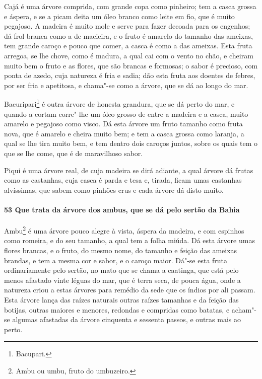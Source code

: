 \begin{linenumbers}
Cajá é uma árvore comprida, com grande copa como pinheiro; tem a casca grossa e áspera, e
se a picam deita um óleo branco como leite em fio, que é muito pegajoso. A madeira é muito
mole e serve para fazer decoada para os engenhos; dá frol branca como a de macieira, e o
fruto é amarelo do tamanho das ameixas, tem grande caroço e pouco que comer, a casca é
como a das ameixas. Esta fruta arregoa, se lhe chove, como é madura, a qual cai com o
vento no chão, e cheiram muito bem o fruto e as flores, que são brancas e formosas; o
sabor é precioso, com ponta de azedo, cuja natureza é fria e sadia; dão esta fruta aos
doentes de febres, por ser fria e apetitosa, e chama"-se como a árvore, que se dá ao longo
do mar.

Bacuripari\footnote{ Bacupari.} é outra árvore de honesta grandura, que se dá perto do
mar, e quando a cortam corre"-lhe um óleo grosso de entre a madeira e a casca, muito
amarelo e pegajoso como visco. Dá esta árvore um fruto tamanho como fruta nova, que é
amarelo e cheira muito bem; e tem a casca grossa como laranja, a qual se lhe tira muito
bem, e tem dentro dois caroços juntos, sobre os quais tem o que se lhe come, que é de
maravilhoso sabor.

Piqui é uma árvore real, de cuja madeira se dirá adiante, a qual árvore dá frutas como as
castanhas, cuja casca é parda e tesa e, tirada, ficam umas castanhas alvíssimas, que sabem
como pinhões crus e cada árvore dá disto muito.

\paragraph{53 Que trata da árvore dos ambus, que se dá pelo sertão da Bahia}\quad
Ambu\footnote{ Ambu ou umbu, fruto do umbuzeiro.} é uma árvore pouco alegre à vista,
áspera da madeira, e com espinhos como romeira, e do seu tamanho, a qual tem a folha
miúda. Dá esta árvore umas flores brancas, e o fruto, do mesmo nome, do tamanho e feição
das ameixas brandas, e tem a mesma cor e sabor, e o caroço maior. Dá"-se esta fruta
ordinariamente pelo sertão, no mato que se chama a caatinga, que está pelo menos afastado
vinte léguas do mar, que é terra seca, de pouca água, onde a natureza criou a estas
árvores para remédio da sede que os índios por ali passam. Esta árvore lança das raízes
naturais outras raízes tamanhas e da feição das botijas, outras maiores e menores,
redondas e compridas como batatas, e acham"-se algumas afastadas da árvore cinquenta e
sessenta passos, e outras mais ao perto.


\end{linenumbers}

